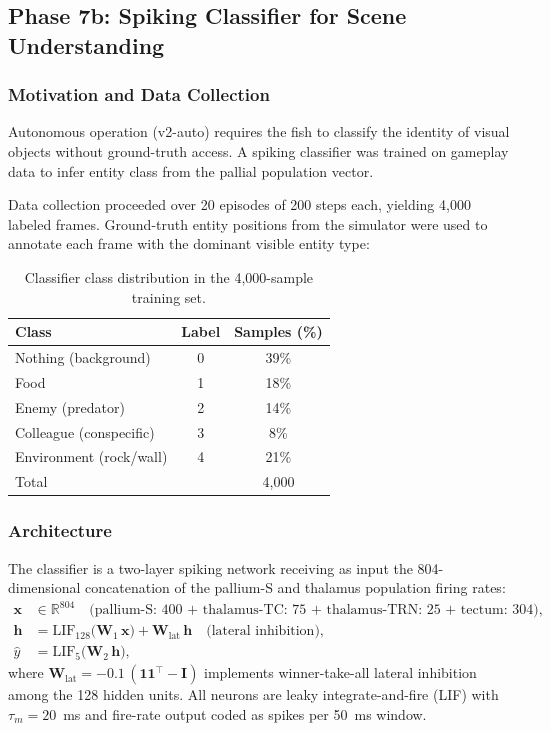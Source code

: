 \documentclass[11pt,a4paper]{article}
\begin{document}
\subsection{Phase 7b: Spiking Classifier for Scene Understanding}\label{sec:classifier}

\subsubsection{Motivation and Data Collection}

Autonomous operation (v2-auto) requires the fish to classify the
identity of visual objects without ground-truth access.
A spiking classifier was trained on gameplay data to infer entity
class from the pallial population vector.

Data collection proceeded over 20 episodes of 200 steps each,
yielding 4{,}000 labeled frames.
Ground-truth entity positions from the simulator were used to
annotate each frame with the dominant visible entity type:

\begin{table}[H]
\centering
\caption{Classifier class distribution in the 4{,}000-sample training set.}
\label{tab:classifier_data}
\begin{tabular}{lcc}
\toprule
Class & Label & Samples (\%) \\
\midrule
Nothing (background)  & 0 & 39\% \\
Food                  & 1 & 18\% \\
Enemy (predator)      & 2 & 14\% \\
Colleague (conspecific) & 3 & 8\% \\
Environment (rock/wall) & 4 & 21\% \\
\midrule
Total & & 4{,}000 \\
\bottomrule
\end{tabular}
\end{table}

\subsubsection{Architecture}

The classifier is a two-layer spiking network receiving as input
the 804-dimensional concatenation of the pallium-S and thalamus
population firing rates:
\begin{equation}\label{eq:classifier_arch}
\begin{aligned}
  \mathbf{x} &\in \mathbb{R}^{804}
    \quad\text{(pallium-S: 400 + thalamus-TC: 75 + thalamus-TRN: 25 + tectum: 304)}, \\
  \mathbf{h} &= \mathrm{LIF}_{128}\bigl(\mathbf{W}_1\,\mathbf{x}\bigr)
    + \mathbf{W}_\mathrm{lat}\,\mathbf{h}
    \quad\text{(lateral inhibition)}, \\
  \hat{y} &= \mathrm{LIF}_{5}\bigl(\mathbf{W}_2\,\mathbf{h}\bigr),
\end{aligned}
\end{equation}
where $\mathbf{W}_\mathrm{lat} = -0.1\,(\mathbf{1}\mathbf{1}^\top - \mathbf{I})$
implements winner-take-all lateral inhibition among the 128 hidden units.
All neurons are leaky integrate-and-fire (LIF) with $\tau_m = 20$~ms
and fire-rate output coded as spikes per 50~ms window.
\end{document}
